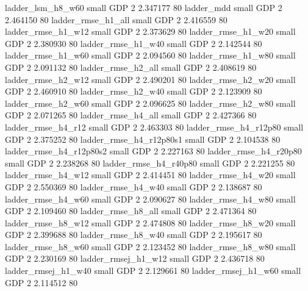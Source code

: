        ladder_lsm_h8_w60      small      GDP                 2 2.347177 80
              ladder_mdd      small      GDP                 2 2.464150 80
      ladder_rmse_h1_all      small      GDP                 2 2.416559 80
      ladder_rmse_h1_w12      small      GDP                 2 2.373629 80
      ladder_rmse_h1_w20      small      GDP                 2 2.380930 80
      ladder_rmse_h1_w40      small      GDP                 2 2.142544 80
      ladder_rmse_h1_w60      small      GDP                 2 2.094560 80
      ladder_rmse_h1_w80      small      GDP                 2 2.091132 80
      ladder_rmse_h2_all      small      GDP                 2 2.408619 80
      ladder_rmse_h2_w12      small      GDP                 2 2.490201 80
      ladder_rmse_h2_w20      small      GDP                 2 2.460910 80
      ladder_rmse_h2_w40      small      GDP                 2 2.123909 80
      ladder_rmse_h2_w60      small      GDP                 2 2.096625 80
      ladder_rmse_h2_w80      small      GDP                 2 2.071265 80
      ladder_rmse_h4_all      small      GDP                 2 2.427366 80
      ladder_rmse_h4_r12      small      GDP                 2 2.463303 80
   ladder_rmse_h4_r12p80      small      GDP                 2 2.375252 80
 ladder_rmse_h4_r12p80s1      small      GDP                 2 2.104538 80
 ladder_rmse_h4_r12p80s2      small      GDP                 2 2.227163 80
   ladder_rmse_h4_r20p80      small      GDP                 2 2.238268 80
   ladder_rmse_h4_r40p80      small      GDP                 2 2.221255 80
      ladder_rmse_h4_w12      small      GDP                 2 2.414451 80
      ladder_rmse_h4_w20      small      GDP                 2 2.550369 80
      ladder_rmse_h4_w40      small      GDP                 2 2.138687 80
      ladder_rmse_h4_w60      small      GDP                 2 2.090627 80
      ladder_rmse_h4_w80      small      GDP                 2 2.109460 80
      ladder_rmse_h8_all      small      GDP                 2 2.471364 80
      ladder_rmse_h8_w12      small      GDP                 2 2.474808 80
      ladder_rmse_h8_w20      small      GDP                 2 2.399688 80
      ladder_rmse_h8_w40      small      GDP                 2 2.195617 80
      ladder_rmse_h8_w60      small      GDP                 2 2.123452 80
      ladder_rmse_h8_w80      small      GDP                 2 2.230169 80
     ladder_rmsej_h1_w12      small      GDP                 2 2.436718 80
     ladder_rmsej_h1_w40      small      GDP                 2 2.129661 80
     ladder_rmsej_h1_w60      small      GDP                 2 2.114512 80
